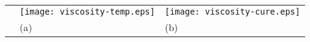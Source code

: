 \documentclass[10pt,a4paper]{article}
\begin{document}
\begin{tabular}{l@{}l@{}l}
             &\texttt{[image: viscosity-temp.eps]}&    \texttt{[image: viscosity-cure.eps]}\\
&(a)  &(b)
\end{tabular}
\end{document}
